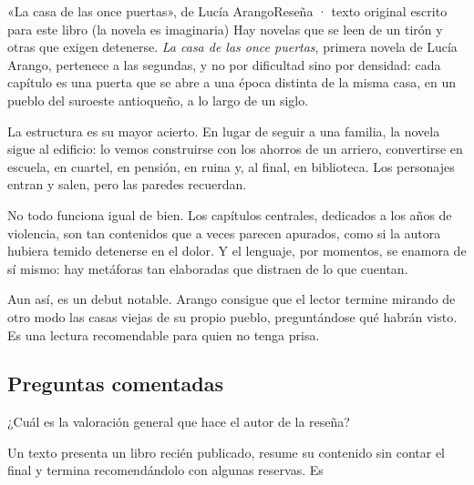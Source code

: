 \begin{texto}{«La casa de las once puertas», de Lucía Arango}{Reseña · texto original escrito para este libro (la novela es imaginaria)}
\pa Hay novelas que se leen de un tirón y otras que exigen detenerse. \emph{La casa de las once puertas}, primera novela de
Lucía Arango, pertenece a las segundas, y no por dificultad sino por densidad: cada capítulo es una puerta que se abre a
una época distinta de la misma casa, en un pueblo del suroeste antioqueño, a lo largo de un siglo.

\pa La estructura es su mayor acierto. En lugar de seguir a una familia, la novela sigue al edificio: lo vemos construirse
con los ahorros de un arriero, convertirse en escuela, en cuartel, en pensión, en ruina y, al final, en biblioteca. Los
personajes entran y salen, pero las paredes recuerdan.

\pa No todo funciona igual de bien. Los capítulos centrales, dedicados a los años de violencia, son tan contenidos que a
veces parecen apurados, como si la autora hubiera temido detenerse en el dolor. Y el lenguaje, por momentos, se enamora de
sí mismo: hay metáforas tan elaboradas que distraen de lo que cuentan.

\pa Aun así, es un debut notable. Arango consigue que el lector termine mirando de otro modo las casas viejas de su propio
pueblo, preguntándose qué habrán visto. Es una lectura recomendable para quien no tenga prisa.
\end{texto}

\subsection{Preguntas comentadas}
\begin{comentada}{¿Cuál es la valoración general que hace el autor de la reseña?}
\end{comentada}

\begin{reto}
Un texto presenta un libro recién publicado, resume su contenido sin contar el final y termina recomendándolo con algunas
reservas. Es
\end{reto}

